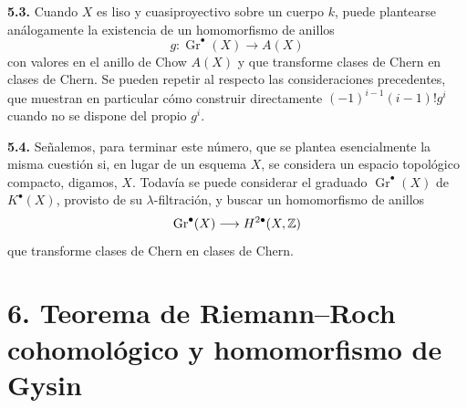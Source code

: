 \textbf{5.3.} Cuando $X$ es liso y cuasiproyectivo sobre un cuerpo $k$,
puede plantearse análogamente la existencia de un homomorfismo de anillos
\[
g:\operatorname{Gr}^\bullet(X)\longrightarrow A(X)
\]
con valores en el anillo de Chow $A(X)$ y que transforme clases de Chern en
clases de Chern. Se pueden repetir al respecto las consideraciones
precedentes, que muestran en particular cómo construir directamente
$(-1)^{i-1}(i-1)!g^i$ cuando no se dispone del propio $g^i$.

\textbf{5.4.} Señalemos, para terminar este número, que se plantea
esencialmente la misma cuestión si, en lugar de un esquema $X$, se considera
un espacio topológico compacto, digamos, $X$. Todavía se puede considerar el
graduado $\operatorname{Gr}^\bullet(X)$ de $K^\bullet(X)$, provisto de su
$\lambda$-filtración, y buscar un homomorfismo de anillos
\[
\operatorname{Gr}^\bullet(X)\longrightarrow H^{2\bullet}(X,\mathbb Z)
\]
que transforme clases de Chern en clases de Chern.

\section*{6. Teorema de Riemann--Roch cohomológico y homomorfismo de Gysin}

